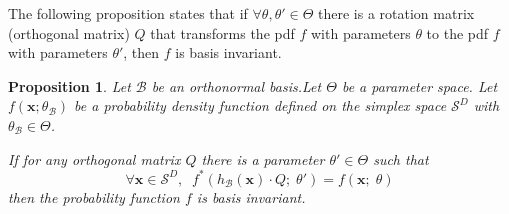 \documentclass[12pt, a4paper]{article}
\newtheorem{prop}{Proposition}
\begin{document}
The following proposition states that if $\forall \theta, \theta' \in \Theta$ there is a rotation matrix (orthogonal matrix) $Q$ that transforms the pdf $f$ with parameters $\theta$ to the pdf $f$ with parameters $\theta'$, then $f$ is basis invariant.

\begin{prop}
Let $\mathcal{B}$ be an orthonormal basis.Let  $\Theta$ be a parameter space. Let $f(\textbf{x} ; \theta_{\mathcal{B}})$ be a probability density function defined on the simplex space $\mathcal{S}^D$ with $\theta_{\mathcal{B}} \in \Theta$.

If for any orthogonal matrix $Q$ there is a parameter $\theta' \in \Theta$ such that 
\[
\forall \textbf{x} \in \mathcal{S}^D, \;\; f^*(h_\mathcal{B}(\textbf{x}) \cdot Q ;\; \theta') = f(\textbf{x};\; \theta) 
\]
then the probability function $f$ is basis invariant.
\end{prop}
\end{document}
